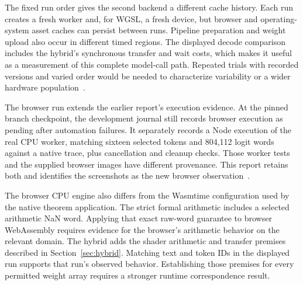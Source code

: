 The fixed run order gives the second backend a different cache history.  Each run creates a fresh worker and, for WGSL, a fresh device, but browser and operating-system asset caches can persist between runs.  Pipeline preparation and weight upload also occur in different timed regions.  The displayed decode comparison includes the hybrid's synchronous transfer and wait costs, which makes it useful as a measurement of this complete model-call path.  Repeated trials with recorded versions and varied order would be needed to characterize variability or a wider hardware population~\cite{browser-source}.

The browser run extends the earlier report's execution evidence.  At the pinned branch checkpoint, the development journal still records browser execution as pending after automation failures.  It separately records a Node execution of the real CPU worker, matching sixteen selected tokens and 804,112 logit words against a native trace, plus cancellation and cleanup checks.  Those worker tests and the supplied browser images have different provenance.  This report retains both and identifies the screenshots as the new browser observation~\cite{wg-journal,browser-tests,screenshots}.

The browser CPU engine also differs from the Wasmtime configuration used by the native theorem application.  The strict formal arithmetic includes a selected arithmetic NaN word.  Applying that exact raw-word guarantee to browser WebAssembly requires evidence for the browser's arithmetic behavior on the relevant domain.  The hybrid adds the shader arithmetic and transfer premises described in Section~\ref{sec:hybrid}.  Matching text and token IDs in the displayed run supports that run's observed behavior.  Establishing those premises for every permitted weight array requires a stronger runtime correspondence result.
